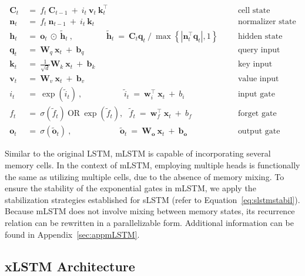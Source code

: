 \begin{align}
\label{eq:mlstm_recurrent_begin}
\mathbf{C}_t \ &= \  f_t \ \mathbf{C}_{t-1} \ + \ 
  i_t \ \mathbf{v}_t \ \mathbf{k}_t^\top & &  &\text{cell state} \\
\mathbf{n}_t \ &= \  f_t \ \mathbf{n}_{t-1} \ + \ 
  i_t \ \mathbf{k}_t & &  &\text{normalizer state} \\
\mathbf{h}_t  \ &= \ \mathbf{o}_t \ \odot \ \tilde{\mathbf{h}}_t
\ , \qquad \qquad 
\tilde{\mathbf{h}}_t \ = \   \mathbf{C}_t \mathbf{q}_t \ / \ 
  \max \left\{ |\mathbf{n}_t^\top \mathbf{q}_t|, 1 \right\} 
   &&&\text{hidden state} \\
\mathbf{q}_t \ &= \ \mathbf{W}_q \ \mathbf{x}_t \ + \ \mathbf{b}_q  & &  &\text{query input} \\
\mathbf{k}_t \ &= \ \frac{1}{\sqrt{d}} \mathbf{W}_k \ \mathbf{x}_t \ + \ \mathbf{b}_k  & &  &\text{key input} \\
\mathbf{v}_t \ &= \ \mathbf{W}_v \ \mathbf{x}_t \ + \ \mathbf{b}_v  & &  &\text{value input} \\
i_t \ &= \ \!\exp \!  \! \left( \tilde{i}_t  \right) \ , 
 \qquad \qquad \ \ \ \ \,
  \tilde{i}_t \ = \ \mathbf{w}^\top_{i} \ \mathbf{x}_t \ + \  b_{i} \ \ \ 
  &&&\text{input gate} \\
f_t \ &= \ \sigma \!  \left(  \tilde{f}_t \right) \ \text{OR} \ \!\exp \!  \! \left(  \tilde{f}_t \right) , \ \ \: \!
\tilde{f}_t \ = \ \mathbf{w}^\top_{f} \ \mathbf{x}_t  \ + \
  b_{f}
  &&& \text{forget gate} \\
\label{eq:mlstm_recurrent_end}
\mathbf{o}_t \ &= \ \sigma \left( \tilde{\mathbf{o}}_t \right) \ , \qquad \qquad \quad \ \ \ \,
  \tilde{\mathbf{o}}_t  \ = \ \mathbf{W}_{\mathbf{o}} \ \mathbf{x}_t \ + \
  \mathbf{b}_{\mathbf{o}}
  &&&\text{output gate} 
\end{align}

Similar to the original LSTM, mLSTM is capable of incorporating several memory cells. In the context of mLSTM, employing multiple heads is functionally the same as utilizing multiple cells, due to the absence of memory mixing. To ensure the stability of the exponential gates in mLSTM, we apply the stabilization strategies established for sLSTM (refer to Equation~\ref{eq:slstmstabil}). 
Because mLSTM does not involve mixing between memory states, its recurrence relation can be rewritten in a parallelizable form. Additional information can be found in Appendix~\ref{sec:appmLSTM}.

\subsection{xLSTM Architecture}
\label{sec:xLSTMarch}

